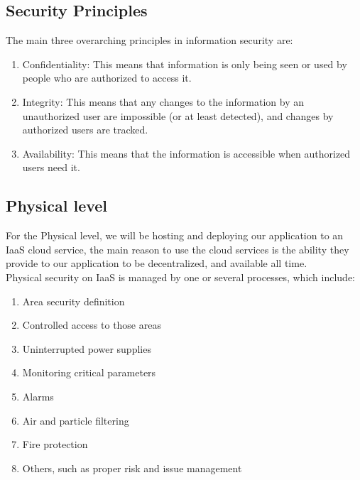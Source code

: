\subsection{Security Principles}
The main three overarching principles in information security are:
\begin{enumerate}
      \item 
      Confidentiality: This means that information is only being seen or used by people who are authorized to access it.
      \item 
      Integrity: This means that any changes to the information by an unauthorized user are impossible (or at least detected), and changes by authorized users are tracked.
      \item 
      Availability: This means that the information is accessible when authorized users need it.
\end{enumerate}

\subsection{Physical level}
For the Physical level, we will be hosting and deploying our application to an IaaS cloud service, the main reason to use the cloud services is the ability they provide to our application to be decentralized, and available all time.\\
Physical security on IaaS is managed by one or several processes, which include:
\begin{enumerate}
      \item 
      Area security definition
      \item 
      Controlled access to those areas
      \item 
      Uninterrupted power supplies
      \item 
      Monitoring critical parameters
      \item 
      Alarms
      \item 
      Air and particle filtering
      \item 
      Fire protection
      \item 
      Others, such as proper risk and issue management
\end{enumerate}

